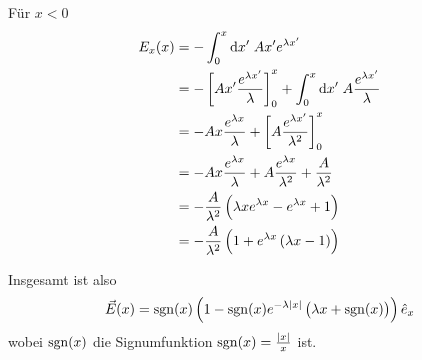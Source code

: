 \documentclass[a4paper,german,12pt,smallheadings]{scrartcl}
\begin{document}
\begin{enumerate}[a)]
  Für $x < 0$
  \begin{align}
    E_x(x) &= -\int_0^x \dif x' \; A x' e^{\lambda x'} \\
    &= -\sbr[3]{A x' \frac{e^{\lambda x'}}{\lambda}}_0^x + \int_0^x \dif x' \; A \frac{e^{\lambda x'}}{\lambda} \\
    &= -A x \frac{e^{\lambda x}}{\lambda} + \sbr[3]{ A \frac{e^{\lambda x'}}{\lambda^2}}_0^x \\
    &= -A x \frac{e^{\lambda x}}{\lambda} + A \frac{e^{\lambda x}}{\lambda^2} + \frac{A}{\lambda^2} \\
    &= -\frac{A}{\lambda^2} \del{\lambda x e^{\lambda x} - e^{\lambda x} + 1} \\
    &= -\frac{A}{\lambda^2} \del{1 + e^{\lambda x}\del{\lambda x - 1}}
  \end{align}

  Insgesamt ist also
  \begin{equation}
    \vec{E}(x) = \sgn(x) \del{1 - \sgn(x) e^{-\lambda |x|} \del{\lambda x + \sgn(x)}} \hat{e}_x
  \end{equation}
  wobei $\operatorname{sgn}(x)$ die Signumfunktion $\operatorname{sgn}(x) = \frac{|x|}{x}$ ist.

\end{enumerate}
\end{document}
